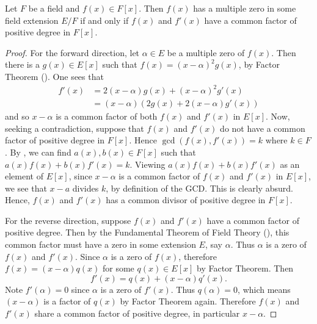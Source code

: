 \begin{theorem}\label{thrm-criterion-for-multiple-zeroes}
    Let $F$ be a field and $f(x) \in F[x]$. Then $f(x)$ has a multiple zero in some field extension $E/F$ if and only if $f(x)$ and $f'(x)$ have a common factor of positive degree in $F[x]$.
\end{theorem}
\begin{proof}
    For the forward direction, let $\alpha \in E$ be a multiple zero of $f(x)$. Then there is a $g(x) \in E[x]$ such that $f(x) = (x-\alpha)^2g(x)$, by Factor Theorem (). One sees that
    \begin{align*}
        f'(x) &= 2(x-\alpha)g(x) + (x-\alpha)^2g'(x)\\
        &= (x-\alpha)\left(2g(x) + 2(x-\alpha)g'(x)\right)
    \end{align*}
    and so $x-\alpha$ is a common factor of both $f(x)$ and $f'(x)$ in $E[x]$. Now, seeking a contradiction, suppose that $f(x)$ and $f'(x)$ do not have a common factor of positive degree in $F[x]$. Hence $\gcd(f(x), f'(x)) = k$ where $k \in F$. By , we can find $a(x), b(x) \in F[x]$ such that $a(x)f(x) + b(x)f'(x) = k$. Viewing $a(x)f(x) + b(x)f'(x)$ as an element of $E[x]$, since $x-\alpha$ is a common factor of $f(x)$ and $f'(x)$ in $E[x]$, we see that $x-a$ divides $k$, by definition of the GCD. This is clearly absurd. Hence, $f(x)$ and $f'(x)$ has a common divisor of positive degree in $F[x]$.

    For the reverse direction, suppose $f(x)$ and $f'(x)$ have a common factor of positive degree. Then by the Fundamental Theorem of Field Theory (), this common factor must have a zero in some extension $E$, say $\alpha$. Thus $\alpha$ is a zero of $f(x)$ and $f'(x)$. Since $\alpha$ is a zero of $f(x)$, therefore $f(x) = (x-\alpha)q(x)$ for some $q(x) \in E[x]$ by Factor Theorem. Then
    \[
        f'(x) = q(x) + (x-\alpha)q'(x).
    \]
    Note $f'(\alpha) = 0$ since $\alpha$ is a zero of $f'(x)$. Thus $q(\alpha) = 0$, which means $(x-\alpha)$ is a factor of $q(x)$ by Factor Theorem again. Therefore $f(x)$ and $f'(x)$ share a common factor of positive degree, in particular $x-\alpha$.
\end{proof}

